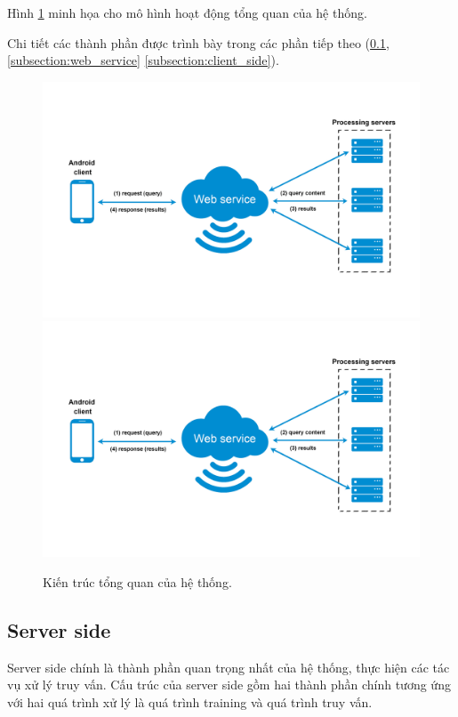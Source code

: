 Hình \ref{FigArchitecture} minh họa cho mô hình hoạt động tổng quan của hệ thống.

Chi tiết các thành phần được trình bày trong các phần tiếp theo (\ref{subsection:server_side}, \ref{subsection:web_service} \ref{subsection:client_side}).

\begin{figure}[!htbp]
  \begin{center}
    \leavevmode
    \ifpdf
      \includegraphics[scale=0.14]{architecture}
    \else
      \includegraphics[scale=0.14]{architecture}
    \fi
    \caption[Kiến trúc tổng quan của hệ thống]{Kiến trúc tổng quan của hệ thống.}
    \label{FigArchitecture}
  \end{center}
\end{figure}

\subsection{Server side}
\label{subsection:server_side}
Server side chính là thành phần quan trọng nhất của hệ thống, thực hiện các tác vụ xử lý truy vấn. Cấu trúc của server side gồm hai thành phần chính tương ứng với hai quá trình xử lý là quá trình training và quá trình truy vấn.

